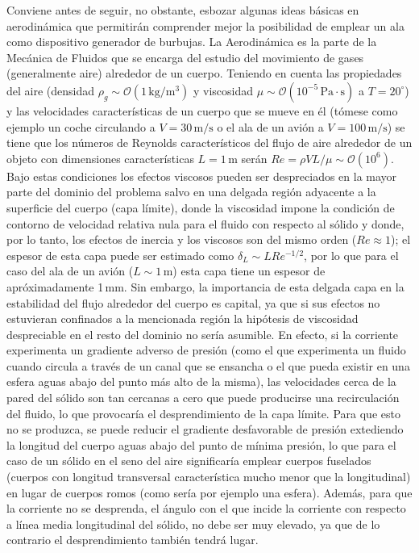 Conviene antes de seguir, no obstante, esbozar algunas ideas básicas en aerodinámica que permitirán comprender mejor la posibilidad de emplear un ala como dispositivo generador de burbujas. La Aerodinámica es la parte de la Mecánica de Fluidos que se encarga del estudio del movimiento de gases (generalmente aire) alrededor de un cuerpo. Teniendo en cuenta las propiedades del aire (densidad $\rho_{g} \sim \mathcal{O}(1\,\mathrm{kg/m^{3}})$ y viscosidad $\mu \sim \mathcal{O}(10^{-5}\,\mathrm{Pa \cdot s})$ a $T = 20^{\circ}$) y las velocidades características de un cuerpo que se mueve en él (tómese como ejemplo un coche circulando a $V = 30\,\mathrm{m/s} $ o el ala de un avión a $V = 100\, \mathrm{m/s}$) se tiene que los números de Reynolds característicos del flujo de aire alrededor de un objeto con dimensiones características $L = 1\,\mathrm{m}$ serán $Re = \rho V L / \mu  \sim \mathcal{O}\left(10^{6}\right)$. Bajo estas condiciones los efectos viscosos pueden ser despreciados en la mayor parte del dominio del problema salvo en una delgada región adyacente a la superficie del cuerpo (capa límite), donde la viscosidad impone la condición de contorno de velocidad relativa nula para el fluido con respecto al sólido y donde, por lo tanto, los efectos de inercia y los viscosos son del mismo orden ($Re \approx 1$); el espesor de esta capa puede ser estimado como $\delta_{L} \sim L Re^{-1/2}$, por lo que para el caso del ala de un avión ($L \sim 1\,\mathrm{m}$) esta capa tiene un espesor de apróximadamente 1\,mm. Sin embargo, la importancia de esta delgada capa en la estabilidad del flujo alrededor del cuerpo es capital, ya que si sus efectos no estuvieran confinados a la mencionada región la hipótesis de viscosidad despreciable en el resto del dominio no sería asumible. En efecto, si la corriente experimenta un gradiente adverso de presión (como el que experimenta un fluido cuando circula a través de un canal que se ensancha o el que pueda existir en una esfera aguas abajo del punto más alto de la misma), las velocidades cerca de la pared del sólido son tan cercanas a cero que puede producirse una recirculación del fluido, lo que provocaría el desprendimiento de la capa límite. Para que esto no se produzca, se puede reducir el gradiente desfavorable de presión extediendo la longitud del cuerpo aguas abajo del punto de mínima presión, lo que para el caso de un sólido en el seno del aire significaría emplear cuerpos fuselados (cuerpos con longitud transversal característica mucho menor que la longitudinal) en lugar de cuerpos romos (como sería por ejemplo una esfera). Además, para que la corriente no se desprenda, el ángulo con el que incide la corriente con respecto a línea media longitudinal del sólido, no debe ser muy elevado, ya que de lo contrario el desprendimiento también tendrá lugar. 

